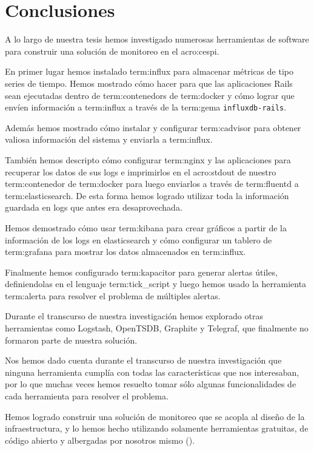 \newpage
\section{Conclusiones}
\label{conclusiones}

A lo largo de nuestra tesis hemos investigado numerosas herramientas de
software para construir una solución de monitoreo en el \gls{acro:cespi}.

En primer lugar hemos instalado \gls{term:influx} para almacenar métricas de
tipo series de tiempo. Hemos mostrado cómo hacer para que las aplicaciones
Rails sean ejecutadas dentro de \glspl{term:contenedor} de \gls{term:docker} y cómo lograr
que envíen información a \gls{term:influx} a través de la \gls{term:gema}
\texttt{influxdb-rails}.

Además hemos mostrado cómo instalar y configurar \gls{term:cadvisor} para
obtener valiosa información del sistema y enviarla a \gls{term:influx}.

También hemos descripto cómo configurar \gls{term:nginx} y las aplicaciones
para recuperar los datos de sus logs e imprimirlos en el \gls{acro:stdout} de
nuestro \gls{term:contenedor} de \gls{term:docker} para luego enviarlos a través de
\gls{term:fluentd} a \gls{term:elasticsearch}. De esta forma hemos logrado
utilizar toda la información guardada en logs que antes era desaprovechada.

Hemos demostrado cómo usar \gls{term:kibana} para crear gráficos a partir de la
información de los logs en elasticsearch y cómo configurar un tablero de
\gls{term:grafana} para mostrar los datos almacenados en \gls{term:influx}.

Finalmente hemos configurado \gls{term:kapacitor} para generar alertas útiles,
definiendolas en el lenguaje \gls{term:tick_script} y luego hemos usado la
herramienta \gls{term:alerta} para resolver el problema de múltiples alertas.

Durante el transcurso de nuestra investigación hemos explorado otras
herramientas como Logstash, OpenTSDB, Graphite y Telegraf, que finalmente no
formaron parte de nuestra solución.

Nos hemos dado cuenta durante el transcurso de nuestra investigación que
ninguna herramienta cumplía con todas las características que nos interesaban,
por lo que muchas veces hemos resuelto tomar sólo algunas funcionalidades de
cada herramienta para resolver el problema.

Hemos logrado construir una solución de monitoreo que se acopla al diseño de la
infraestructura, y lo hemos hecho utilizando solamente herramientas gratuitas,
de código abierto y albergadas por nosotros mismo ().


